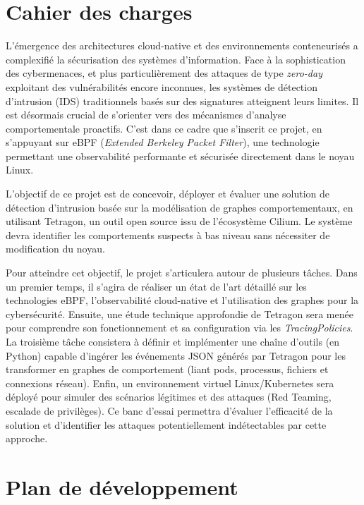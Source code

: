 \documentclass[a4paper,12pt]{article}
\begin{document}
\newpage

\section{Cahier des charges}

L'émergence des architectures cloud-native et des environnements conteneurisés a complexifié la sécurisation des systèmes d'information. Face à la sophistication des cybermenaces, et plus particulièrement des attaques de type \textit{zero-day} exploitant des vulnérabilités encore inconnues, les systèmes de détection d'intrusion (IDS) traditionnels basés sur des signatures atteignent leurs limites. Il est désormais crucial de s'orienter vers des mécanismes d'analyse comportementale proactifs. C'est dans ce cadre que s'inscrit ce projet, en s'appuyant sur eBPF (\textit{Extended Berkeley Packet Filter}), une technologie permettant une observabilité performante et sécurisée directement dans le noyau Linux.

L'objectif de ce projet est de concevoir, déployer et évaluer une solution de détection d'intrusion basée sur la modélisation de graphes comportementaux, en utilisant Tetragon, un outil open source issu de l'écosystème Cilium. Le système devra identifier les comportements suspects à bas niveau sans nécessiter de modification du noyau.

Pour atteindre cet objectif, le projet s'articulera autour de plusieurs tâches. Dans un premier temps, il s'agira de réaliser un état de l'art détaillé sur les technologies eBPF, l'observabilité cloud-native et l'utilisation des graphes pour la cybersécurité. Ensuite, une étude technique approfondie de Tetragon sera menée pour comprendre son fonctionnement et sa configuration via les \textit{TracingPolicies}. 
La troisième tâche consistera à définir et implémenter une chaîne d'outils (en Python) capable d'ingérer les événements JSON générés par Tetragon pour les transformer en graphes de comportement (liant pods, processus, fichiers et connexions réseau). 
Enfin, un environnement virtuel Linux/Kubernetes sera déployé pour simuler des scénarios légitimes et des attaques (Red Teaming, escalade de privilèges). Ce banc d'essai permettra d'évaluer l'efficacité de la solution et d'identifier les attaques potentiellement indétectables par cette approche.

\section{Plan de développement}
\end{document}
